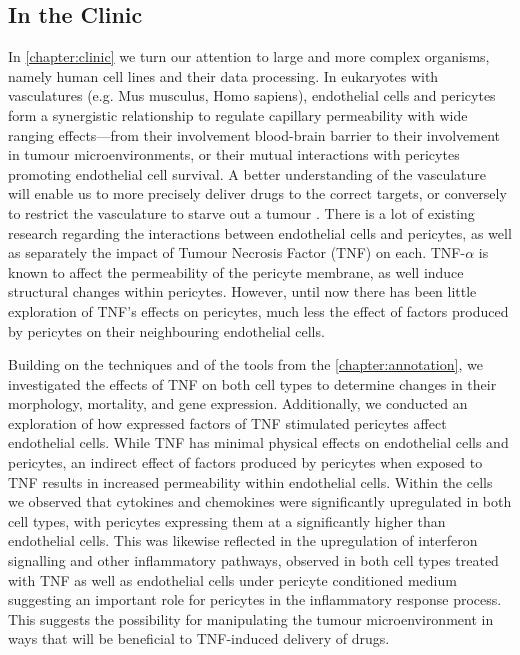 \subsection{In the Clinic}

In \cref{chapter:clinic} we turn our attention to large and more complex organisms, namely human cell lines and their data processing. In eukaryotes with vasculatures (e.g. Mus musculus, Homo sapiens), endothelial cells and pericytes form a synergistic relationship to regulate capillary permeability with wide ranging effects---from their involvement blood-brain barrier\cite{Netzahualcoyotzi_2024} to their involvement in tumour microenvironments\cite{Jiang_2023}, or their mutual interactions with pericytes promoting endothelial cell survival\cite{T_r_k_2021}. A better understanding of the vasculature will enable us to more precisely deliver drugs to the correct targets, or conversely to restrict the vasculature to starve out a tumour \cite{Ten_Hagen_2008,Seynhaeve_2007}. There is a lot of existing research regarding the interactions between endothelial cells and pericytes, as well as separately the impact of Tumour Necrosis Factor (TNF) on each. TNF-$\alpha$ is known to affect the permeability of the pericyte membrane\cite{Seynhaeve_2006,Kerkar_2006}, as well induce structural changes within pericytes. However, until now there has been little exploration of TNF's effects on pericytes, much less the effect of factors produced by pericytes on their neighbouring endothelial cells.

Building on the techniques and of the tools from the \cref{chapter:annotation}, we investigated the effects of TNF on both cell types to determine changes in their morphology, mortality, and gene expression.
Additionally, we conducted an exploration of how expressed factors of TNF stimulated pericytes affect endothelial cells. While TNF has minimal physical effects on endothelial cells and pericytes, an indirect effect of factors produced by pericytes when exposed to TNF results in increased permeability within endothelial cells.
Within the cells we observed that cytokines and chemokines were significantly upregulated in both cell types, with pericytes expressing them at a significantly higher than endothelial cells.
This was likewise reflected in the upregulation of interferon signalling and other inflammatory pathways, observed in both cell types treated with TNF as well as endothelial cells under pericyte conditioned medium suggesting an important role for pericytes in the inflammatory response process.
This suggests the possibility for manipulating the tumour microenvironment in ways that will be beneficial to TNF-induced delivery of drugs.

